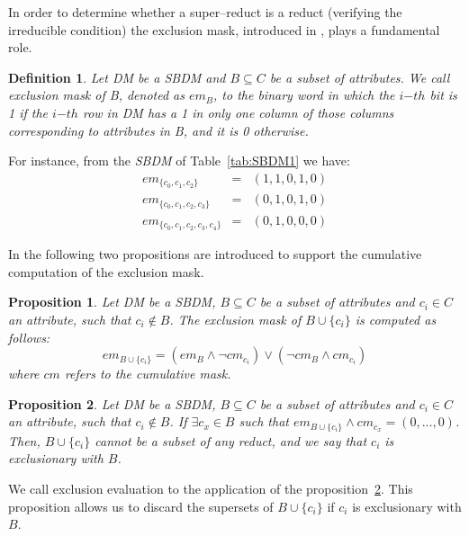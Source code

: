 \documentclass[number,preprint,review,12pt]{elsarticle}
\newtheorem{proposition}{Proposition}
\newtheorem{definition}{Definition}
\begin{document}
	In order to determine whether a super--reduct is a reduct (verifying the irreducible condition) the
	exclusion mask, introduced in \cite{Lias09}, plays a fundamental role. 
	
	\begin{definition}\label{def:exclusion}
		Let DM be a SBDM and $B \subseteq C$ be a subset of attributes. We call exclusion mask of B, denoted as $em_B$, to the binary word in which the $i{\mathit{-th}}$ bit is 1 if the $i{\mathit{-th}}$ row in DM has a 1 in only one column of those columns corresponding to attributes in B, and it is 0 otherwise.
	\end{definition}
	
	For instance, from the \textit{SBDM} of Table~\ref{tab:SBDM1} we have:
	$$\begin{array}{lcc}
	  em_{\lbrace c_0,c_1,c_2\rbrace}         &=& (1,1,0,1,0)\\
	  em_{\lbrace c_0,c_1,c_2,c_3\rbrace}     &=& (0,1,0,1,0)\\
	  em_{\lbrace c_0,c_1,c_2,c_3,c_4\rbrace} &=& (0,1,0,0,0)
	\end{array}$$
	
	In \cite{Lias13} the following two propositions are introduced to support the cumulative computation of the exclusion mask.
	
	\begin{proposition}\label{prop:cumul} 
		Let DM be a SBDM, $B \subseteq C$ be a subset of attributes and $c_i \in C$ an attribute, such that $c_i \notin B$. The exclusion mask of $B \cup \lbrace c_i\rbrace$ is computed as follows: $$em_{B \cup \lbrace c_i\rbrace}=(em_B \wedge \neg cm_{c_i}) \vee (\neg cm_B \wedge cm_{c_i})$$ where $cm$ refers to the cumulative mask.
	\end{proposition}
	
	
	\begin{proposition}\label{prop:exclude} 
		Let DM be a SBDM, $B \subseteq C$ be a subset of attributes and $c_i \in C$ an attribute, such that $c_i \notin B$. If $\exists c_x \in B$ such that $em_{B \cup \lbrace c_i\rbrace} \wedge cm_{c_x}=(0,...,0)$. Then, $B \cup \lbrace c_i\rbrace$ cannot be a subset of any reduct, and we say that $c_i$ is exclusionary with $B$.
	\end{proposition}
	
	We call exclusion evaluation to the application of the proposition~\ref{prop:exclude}. This proposition allows us to discard the supersets of $B \cup \lbrace c_i\rbrace$ if $c_i$ is exclusionary with $B$.
	
\end{document}
